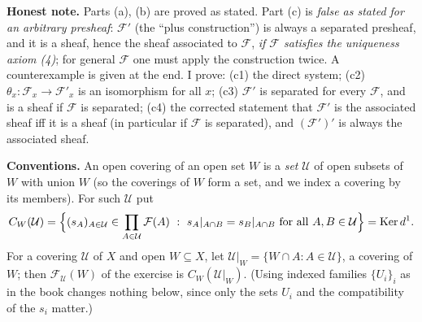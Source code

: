 \documentclass[11pt]{article}
\begin{document}
\pf
\textbf{Honest note.} Parts (a), (b) are proved as stated. Part (c) is \emph{false as stated for an arbitrary presheaf}: $\mathcal F'$ (the ``plus construction'') is always a separated presheaf, and it is a sheaf, hence the sheaf associated to $\mathcal F$, \emph{if $\mathcal F$ satisfies the uniqueness axiom (4)}; for general $\mathcal F$ one must apply the construction twice. A counterexample is given at the end. I prove: (c1) the direct system; (c2) $\theta_x:\mathcal F_x\to\mathcal F'_x$ is an isomorphism for all $x$; (c3) $\mathcal F'$ is separated for every $\mathcal F$, and is a sheaf if $\mathcal F$ is separated; (c4) the corrected statement that $\mathcal F'$ is the associated sheaf iff it is a sheaf (in particular if $\mathcal F$ is separated), and $(\mathcal F')'$ is always the associated sheaf.

\textbf{Conventions.} An open covering of an open set $W$ is a \emph{set} $\mathcal U$ of open subsets of $W$ with union $W$ (so the coverings of $W$ form a set, and we index a covering by its members). For such $\mathcal U$ put
\[ C_W(\mathcal U)=\Bigl\{(s_A)_{A\in\mathcal U}\in\prod_{A\in\mathcal U}\mathcal F(A)\ :\ s_A|_{A\cap B}=s_B|_{A\cap B}\ \text{for all }A,B\in\mathcal U\Bigr\}=\Ker d^1 .\]
For a covering $\mathcal U$ of $X$ and open $W\subseteq X$, let $\mathcal U|_W=\{W\cap A:A\in\mathcal U\}$, a covering of $W$; then $\mathcal F_{\mathcal U}(W)$ of the exercise is $C_W(\mathcal U|_W)$. (Using indexed families $\{U_i\}_i$ as in the book changes nothing below, since only the sets $U_i$ and the compatibility of the $s_i$ matter.)
\end{document}
